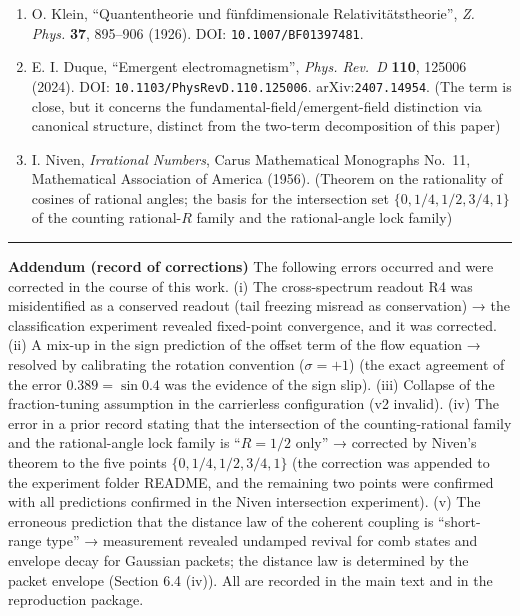 \documentclass[
  a4paper,
]{article}
\begin{document}
\begin{enumerate}
  P. A. M. Dirac, ``The cosmological constants'', \emph{Nature}
  \textbf{139}, 323 (1937). DOI: \texttt{10.1038/139323a0}.
  (Large-number correspondence between force ratios and scale ratios.
  The same hypothesis's prediction of a time-varying G is not forced by
  the framework of this paper)
\item
  O. Klein, ``Quantentheorie und fünfdimensionale Relativitätstheorie'',
  \emph{Z. Phys.} \textbf{37}, 895--906 (1926). DOI:
  \texttt{10.1007/BF01397481}.
\item
  E. I. Duque, ``Emergent electromagnetism'', \emph{Phys. Rev.~D}
  \textbf{110}, 125006 (2024). DOI:
  \texttt{10.1103/PhysRevD.110.125006}. arXiv:\texttt{2407.14954}. (The
  term is close, but it concerns the fundamental-field/emergent-field
  distinction via canonical structure, distinct from the two-term
  decomposition of this paper)
\item
  I. Niven, \emph{Irrational Numbers}, Carus Mathematical Monographs
  No.~11, Mathematical Association of America (1956). (Theorem on the
  rationality of cosines of rational angles; the basis for the
  intersection set \(\{0,1/4,1/2,3/4,1\}\) of the counting
  rational-\(R\) family and the rational-angle lock family)
\end{enumerate}

\begin{center}\rule{0.5\linewidth}{0.5pt}\end{center}

\textbf{Addendum (record of corrections)} The following errors occurred
and were corrected in the course of this work. (i) The cross-spectrum
readout R4 was misidentified as a conserved readout (tail freezing
misread as conservation) → the classification experiment revealed
fixed-point convergence, and it was corrected. (ii) A mix-up in the sign
prediction of the offset term of the flow equation → resolved by
calibrating the rotation convention (\(\sigma=+1\)) (the exact agreement
of the error \(0.389=\sin0.4\) was the evidence of the sign slip). (iii)
Collapse of the fraction-tuning assumption in the carrierless
configuration (v2 invalid). (iv) The error in a prior record stating
that the intersection of the counting-rational family and the
rational-angle lock family is ``\(R=1/2\) only'' → corrected by Niven's
theorem to the five points \(\{0,1/4,1/2,3/4,1\}\) (the correction was
appended to the experiment folder README, and the remaining two points
were confirmed with all predictions confirmed in the Niven intersection
experiment). (v) The erroneous prediction that the distance law of the
coherent coupling is ``short-range type'' → measurement revealed
undamped revival for comb states and envelope decay for Gaussian
packets; the distance law is determined by the packet envelope (Section
6.4 (iv)). All are recorded in the main text and in the reproduction
package.
\end{document}
